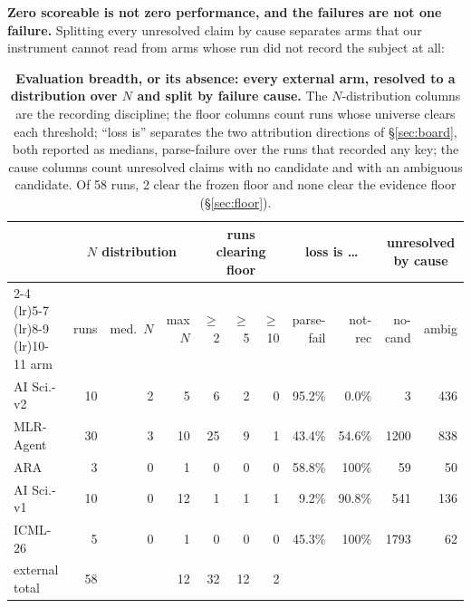 \documentclass[10pt]{article}
\newcommand{\RM}[1]{{#1}}
\begin{document}
\textbf{Zero scoreable is not zero performance, and the failures are not one
failure.} Splitting every unresolved claim by cause separates arms that our
instrument cannot read from arms whose run did not record the subject at all:

\begin{table}[t]
\centering\small
\setlength{\tabcolsep}{4pt}
\begin{tabular}{@{}l rrr rrr rr rr@{}}
\toprule
 & \multicolumn{3}{c}{$N$ distribution} & \multicolumn{3}{c}{runs clearing floor} & \multicolumn{2}{c}{loss is \dots} & \multicolumn{2}{c}{unresolved by cause} \\
\cmidrule(lr){2-4} \cmidrule(lr){5-7} \cmidrule(lr){8-9} \cmidrule(lr){10-11}
arm & runs & med.\ $N$ & max $N$ & $\ge$2 & $\ge$5 & $\ge$10 & parse-fail & not-rec & no-cand & ambig \\
\midrule
AI Sci.-v2  & \RM{10} & \RM{2} & \RM{5}  & \RM{6}  & \RM{2} & \RM{0} & \RM{95.2\%} & \RM{0.0\%}  & \RM{3}    & \RM{436} \\
MLR-Agent   & \RM{30} & \RM{3} & \RM{10} & \RM{25} & \RM{9} & \RM{1} & \RM{43.4\%} & \RM{54.6\%} & \RM{1200} & \RM{838} \\
ARA         & \RM{3}  & \RM{0} & \RM{1}  & \RM{0}  & \RM{0} & \RM{0} & \RM{58.8\%} & \RM{100\%}  & \RM{59}   & \RM{50} \\
AI Sci.-v1  & \RM{10} & \RM{0} & \RM{12} & \RM{1}  & \RM{1} & \RM{1} & \RM{9.2\%}  & \RM{90.8\%} & \RM{541}  & \RM{136} \\
ICML-26     & \RM{5}  & \RM{0} & \RM{1}  & \RM{0}  & \RM{0} & \RM{0} & \RM{45.3\%} & \RM{100\%}  & \RM{1793} & \RM{62} \\
\midrule
external total & \RM{58} & & \RM{12} & \RM{32} & \RM{12} & \RM{2} & & & & \\
\bottomrule
\end{tabular}
\caption{\textbf{Evaluation breadth, or its absence: every external arm, resolved
to a distribution over $N$ and split by failure cause.} The $N$-distribution
columns are the recording discipline; the floor columns count runs whose
universe clears each threshold; ``loss is'' separates the two attribution
directions of \S\ref{sec:board}, both reported as medians, parse-failure over
the runs that recorded any key; the cause columns count unresolved claims with
no candidate and with an ambiguous candidate. Of \RM{58} runs, \RM{2} clear the
frozen floor and none clear the evidence floor (\S\ref{sec:floor}).}
\label{tab:broad}
\end{table}
\end{document}
